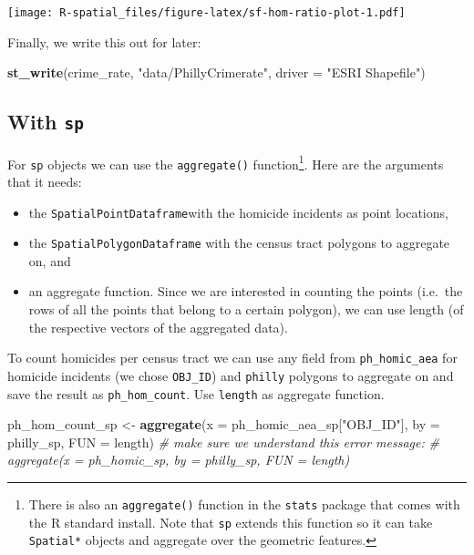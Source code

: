 \documentclass[]{book}
\newenvironment{Shaded}{\begin{snugshade}}{\end{snugshade}}
\newcommand{\KeywordTok}[1]{\textcolor[rgb]{0.13,0.29,0.53}{\textbf{#1}}}
\newcommand{\DataTypeTok}[1]{\textcolor[rgb]{0.13,0.29,0.53}{#1}}
\newcommand{\StringTok}[1]{\textcolor[rgb]{0.31,0.60,0.02}{#1}}
\newcommand{\CommentTok}[1]{\textcolor[rgb]{0.56,0.35,0.01}{\textit{#1}}}
\newcommand{\NormalTok}[1]{#1}
\providecommand{\tightlist}{%
  \setlength{\itemsep}{0pt}\setlength{\parskip}{0pt}}
\let\rmarkdownfootnote\footnote%
\def\footnote{\protect\rmarkdownfootnote}
\begin{document}
\texttt{[image: R-spatial\_files/figure-latex/sf-hom-ratio-plot-1.pdf]}

Finally, we write this out for later:

\begin{Shaded}
\begin{Highlighting}[]
\KeywordTok{st_write}\NormalTok{(crime_rate, }\StringTok{"data/PhillyCrimerate"}\NormalTok{, }\DataTypeTok{driver =} \StringTok{"ESRI Shapefile"}\NormalTok{)}
\end{Highlighting}
\end{Shaded}

\subsection{\texorpdfstring{With \texttt{sp}}{With sp}}\label{with-sp-1}

For \texttt{sp} objects we can use the \texttt{aggregate()}
function\footnote{There is also an \texttt{aggregate()} function in the
  \texttt{stats} package that comes with the R standard install. Note
  that \texttt{sp} extends this function so it can take
  \texttt{Spatial*} objects and aggregate over the geometric features.}.
Here are the arguments that it needs:

\begin{itemize}
\tightlist
\item
  the \texttt{SpatialPointDataframe}with the homicide incidents as point
  locations,
\item
  the \texttt{SpatialPolygonDataframe} with the census tract polygons to
  aggregate on, and
\item
  an aggregate function. Since we are interested in counting the points
  (i.e.~the rows of all the points that belong to a certain polygon), we
  can use length (of the respective vectors of the aggregated data).
\end{itemize}

To count homicides per census tract we can use any field from
\texttt{ph\_homic\_aea} for homicide incidents (we chose
\texttt{OBJ\_ID}) and \texttt{philly} polygons to aggregate on and save
the result as \texttt{ph\_hom\_count}. Use \texttt{length} as aggregate
function.

\begin{Shaded}
\begin{Highlighting}[]
\NormalTok{ph_hom_count_sp <-}\StringTok{ }\KeywordTok{aggregate}\NormalTok{(}\DataTypeTok{x =}\NormalTok{ ph_homic_aea_sp[}\StringTok{"OBJ_ID"}\NormalTok{], }\DataTypeTok{by =}\NormalTok{ philly_sp, }\DataTypeTok{FUN =}\NormalTok{ length)}
\CommentTok{# make sure we understand this error message:}
\CommentTok{# aggregate(x = ph_homic_sp, by = philly_sp, FUN = length) }
\end{Highlighting}
\end{Shaded}
\end{document}
